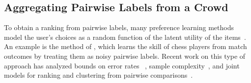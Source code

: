 \subsection{Aggregating Pairwise Labels from a Crowd} %


To obtain a ranking from pairwise labels, many preference learning methods model
the user's choices as a random function of the latent utility of the items~\citep{thurstone1927law}.
An example is the method of \citet{herbrich2007trueskill}, which learns the skill of chess players from 
match outcomes by treating them as noisy pairwise labels.
Recent work on this type of approach has analyzed bounds on error rates ~\citep{chen2015spectral}, 
sample complexity~\citep{shah2015estimation}, and joint models for ranking and clustering from pairwise comparisons~\citep{li2018simultaneous}.

